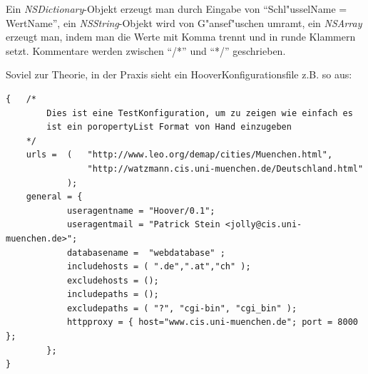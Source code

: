 Ein {\em NSDictionary}-Objekt erzeugt man durch Eingabe von "`Schl"usselName = WertName"', ein {\em NSString}-Objekt wird von G"ansef"uschen umramt, ein {\em NSArray} erzeugt man, indem man die Werte mit Komma trennt und in runde Klammern setzt. Kommentare werden zwischen "`/*"' und "`*/"' geschrieben.

Soviel zur Theorie, in der Praxis sieht ein HooverKonfigurationsfile z.B. so aus:

{\small
\begin{verbatim}
{   /*
        Dies ist eine TestKonfiguration, um zu zeigen wie einfach es
        ist ein poropertyList Format von Hand einzugeben
    */
    urls =  (   "http://www.leo.org/demap/cities/Muenchen.html",
                "http://watzmann.cis.uni-muenchen.de/Deutschland.html"
            );
    general = {
            useragentname = "Hoover/0.1";
            useragentmail = "Patrick Stein <jolly@cis.uni-muenchen.de>";
            databasename =  "webdatabase" ;
            includehosts = ( ".de",".at","ch" );
            excludehosts = ();
            includepaths = ();
            excludepaths = ( "?", "cgi-bin", "cgi_bin" );
            httpproxy = { host="www.cis.uni-muenchen.de"; port = 8000 };
        };
}
\end{verbatim}
}

